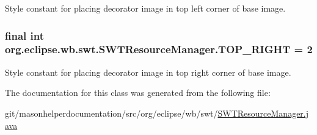 Style constant for placing decorator image in top left corner of base image. \hypertarget{classorg_1_1eclipse_1_1wb_1_1swt_1_1_s_w_t_resource_manager_a024b59862eb3bc6eec12dd2bec92c1e5}{
\subsubsection[{T\-O\-P\-\_\-\-R\-I\-G\-H\-T}]{\setlength{\rightskip}{0pt plus 5cm}final int org.\-eclipse.\-wb.\-swt.\-S\-W\-T\-Resource\-Manager.\-T\-O\-P\-\_\-\-R\-I\-G\-H\-T = 2\hspace{0.3cm}{\ttfamily [static]}}}\label{classorg_1_1eclipse_1_1wb_1_1swt_1_1_s_w_t_resource_manager_a024b59862eb3bc6eec12dd2bec92c1e5}
Style constant for placing decorator image in top right corner of base image. 

The documentation for this class was generated from the following file\-:\begin{DoxyCompactItemize}
\item 
git/masonhelperdocumentation/src/org/eclipse/wb/swt/\hyperlink{_s_w_t_resource_manager_8java}{S\-W\-T\-Resource\-Manager.\-java}\end{DoxyCompactItemize}
